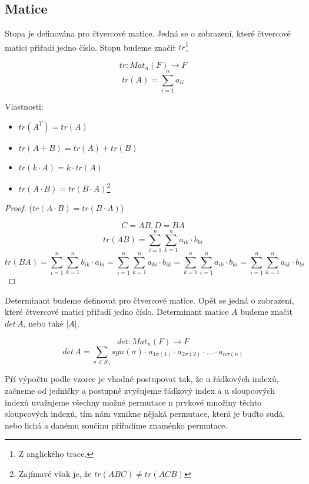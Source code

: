 \subsection{Matice}

\begin{definition}[Stopa]
    Stopa je definována pro čtvercové matice. Jedná se o zobrazení,
    které čtvercové matici přiřadí jedno číslo. Stopu budeme značit
    $tr$\footnote{Z anglického trace.}

    $$tr: Mat_n(F) \rightarrow F$$
    $$tr(A) = \sum_{i=1}^na_{ii}$$

    Vlastnosti:
    \begin{itemize}
        \item $tr(A^T) = tr(A)$
        \item $tr(A + B) = tr(A) + tr(B)$
        \item $tr(k \cdot A) = k \cdot tr(A)$
        \item $tr(A\cdot B) = tr(B \cdot A)$\footnote{Zajímavé však je, že
        $tr(ABC) \neq tr(ACB)$}
    \end{itemize}

\end{definition}
\begin{proof}
    ($tr(A\cdot B) = tr(B \cdot A)$)

    $$C = AB, D = BA$$
    $$tr(AB) = \sum_{i=1}^n\sum_{k=1}^n a_{ik} \cdot b_{ki}$$
    $$tr(BA) = \sum_{i=1}^n\sum_{k=1}^n b_{ik} \cdot a_{ki} = \sum_{i=1}^n\sum_{k=1}^n a_{ki}
    \cdot b_{ik} = \sum_{k=1}^n\sum_{i=1}^n a_{ik} \cdot b_{ki} =
    \sum_{i=1}^n\sum_{k=1}^n a_{ik} \cdot b_{ki}$$

\end{proof}

\begin{definition}[Determinant]
    \label{def:determinant}
    Determinant budeme definovat pro čtvercové matice.
    Opět se jedná o zobrazení, které čtvercové matici přiřadí
    jedno číslo. Determinant matice $A$ budeme značit $det\,A$, nebo také $|A|$.

    $$det: Mat_n(F) \rightarrow F$$
    $$det\, A = \sum_{\sigma \in S_n} sgn(\sigma) \cdot a_{1\sigma(1)} \cdot a_{2\sigma(2)}
    \cdot \ldots \cdot a_{n\sigma(n)}$$

    Pří výpočtu podle vzorce je vhodné postupovat tak, že u řádkových indexů, začneme
    od jedničky a postupně zvyšujeme řádkový index a u sloupcových indexů uvažujeme všechny možné
    permutace n prvkové množiny těchto sloupcových indexů, tím nám vznikne nějaká permutace, která
    je buďto sudá, nebo lichá a danému součinu přiřadíme znaménko permutace.
\end{definition}

